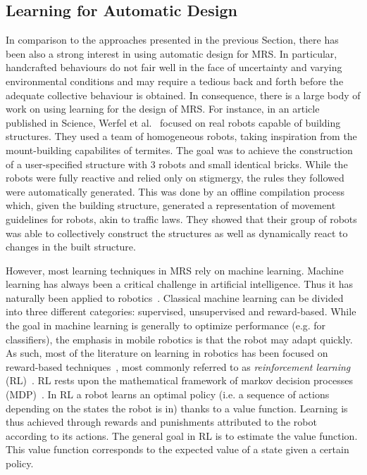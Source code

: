   \subsection{Learning for Automatic Design}

    In comparison to the approaches presented in the previous Section, there has been also a strong interest in using automatic design for MRS. In particular, handcrafted behaviours do not fair well in the face of uncertainty and varying environmental conditions and may require a tedious back and forth before the adequate collective behaviour is obtained. In consequence, there is a large body of work on using learning for the design of MRS. For instance, in an article published in Science, Werfel et al.~\parencite{Werfel2014} focused on real robots capable of building structures. They used a team of homogeneous robots, taking inspiration from the mount-building capabilites of termites. The goal was to achieve the construction of a user-specified structure with $3$ robots and small identical bricks. While the robots were fully reactive and relied only on stigmergy, the rules they followed were automatically generated. This was done by an offline compilation process which, given the building structure, generated a representation of movement guidelines for robots, akin to traffic laws. They showed that their group of robots was able to collectively construct the structures as well as dynamically react to changes in the built structure.

    However, most learning techniques in MRS rely on machine learning. Machine learning has always been a critical challenge in artificial intelligence. Thus it has naturally been applied to robotics~\parencite{Hertzberg2008}. Classical machine learning can be divided into three different categories: supervised, unsupervised and reward-based. While the goal in machine learning is generally to optimize performance (e.g. for classifiers), the emphasis in mobile robotics is that the robot may adapt quickly. As such, most of the literature on learning in robotics has been focused on reward-based techniques~\parencite{Mataric2008}, most commonly referred to as \emph{reinforcement learning} (RL)~\parencite{Sutton1998}. RL rests upon the mathematical framework of markov decision processes (MDP)~\parencite{Bellman1957}. In RL a robot learns an optimal policy (i.e. a sequence of actions depending on the states the robot is in) thanks to a value function. Learning is thus achieved through rewards and punishments attributed to the robot according to its actions. The general goal in RL is to estimate the value function. This value function corresponds to the expected value of a state given a certain policy.

